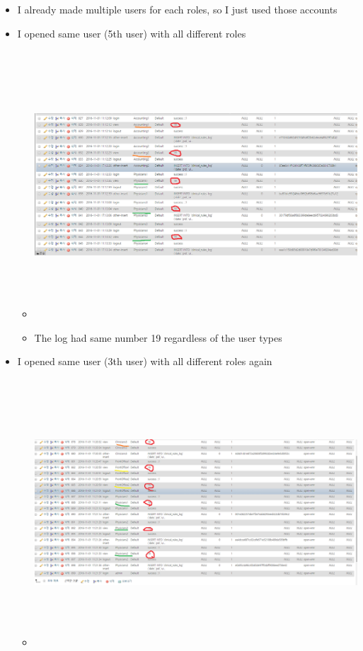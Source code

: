 \documentclass[paper=a4, fontsize=11pt]{scrartcl} %
\numberwithin{equation}{section} %
\numberwithin{figure}{section} %
\numberwithin{table}{section} %
\begin{document}
\begin{itemize}
	\item I already made multiple users for each roles, so I just used those accounts
	\item I opened same user (5th user) with all different roles
		\begin{itemize}
		\item
		 \includegraphics[width = 20cm, height=10cm]{pictures/same19.png}
		\item The log had same number 19 regardless of the user types
		\end{itemize}
	\item I opened same user (3th user) with all different roles again
		\begin{itemize}
		\item
		 \includegraphics[width = 20cm, height=10cm]{pictures/same16.png}

\end{itemize}
\end{itemize}
\end{document}

